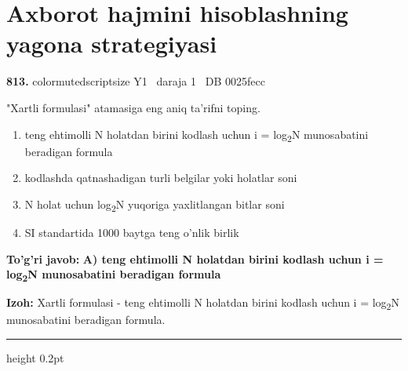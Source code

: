 \documentclass[10pt,a4paper,oneside]{article}
\begin{document}
\section{Axborot hajmini hisoblashning yagona strategiyasi}

\noindent\textbf{\color{ink}813.}  {color{muted}scriptsize Y1 \textbullet\ daraja 1 \textbullet\ DB 0025fecc}
\par
"Xartli formulasi" atamasiga eng aniq ta'rifni toping.
\begin{enumerate}[label=\Alph*),leftmargin=9mm]
\item teng ehtimolli N holatdan birini kodlash uchun i = log\textsubscript{2}N munosabatini beradigan formula
\item kodlashda qatnashadigan turli belgilar yoki holatlar soni
\item N holat uchun log\textsubscript{2}N yuqoriga yaxlitlangan bitlar soni
\item SI standartida 1000 baytga teng o'nlik birlik
\end{enumerate}
\begin{tcolorbox}[enhanced,breakable,colback=teal!4,colframe=teal!50!black,boxrule=0.5pt,arc=1.1mm,left=3mm,right=3mm,top=1.7mm,bottom=1.7mm,before skip=2mm,after skip=2mm]
\textbf{\color{teal}To'g'ri javob:} \textbf{A) teng ehtimolli N holatdan birini kodlash uchun i = log\textsubscript{2}N munosabatini beradigan formula}
\par\smallskip
\textbf{Izoh:} Xartli formulasi - teng ehtimolli N holatdan birini kodlash uchun i = log\textsubscript{2}N munosabatini beradigan formula.
\end{tcolorbox}
\vspace{2mm}\hrule height 0.2pt \vspace{3mm}
\end{document}
